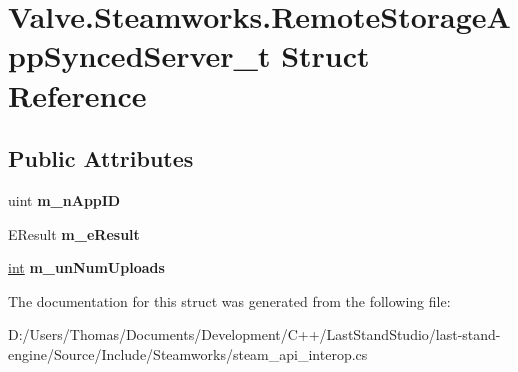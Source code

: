 \hypertarget{structValve_1_1Steamworks_1_1RemoteStorageAppSyncedServer__t}{}\section{Valve.\+Steamworks.\+Remote\+Storage\+App\+Synced\+Server\+\_\+t Struct Reference}
\label{structValve_1_1Steamworks_1_1RemoteStorageAppSyncedServer__t}
\subsection*{Public Attributes}
\begin{DoxyCompactItemize}
\item 
\hypertarget{structValve_1_1Steamworks_1_1RemoteStorageAppSyncedServer__t_a214b906501a62699f359b30528614b03}{}uint {\bfseries m\+\_\+n\+App\+I\+D}\label{structValve_1_1Steamworks_1_1RemoteStorageAppSyncedServer__t_a214b906501a62699f359b30528614b03}

\item 
\hypertarget{structValve_1_1Steamworks_1_1RemoteStorageAppSyncedServer__t_a1bcf46e9b3b96582aa9fbbf64b6270ea}{}E\+Result {\bfseries m\+\_\+e\+Result}\label{structValve_1_1Steamworks_1_1RemoteStorageAppSyncedServer__t_a1bcf46e9b3b96582aa9fbbf64b6270ea}

\item 
\hypertarget{structValve_1_1Steamworks_1_1RemoteStorageAppSyncedServer__t_aa7e0f80e4fdb1f9b534a2e2e16fc6e70}{}\hyperlink{SDL__thread_8h_a6a64f9be4433e4de6e2f2f548cf3c08e}{int} {\bfseries m\+\_\+un\+Num\+Uploads}\label{structValve_1_1Steamworks_1_1RemoteStorageAppSyncedServer__t_aa7e0f80e4fdb1f9b534a2e2e16fc6e70}

\end{DoxyCompactItemize}


The documentation for this struct was generated from the following file\+:\begin{DoxyCompactItemize}
\item 
D\+:/\+Users/\+Thomas/\+Documents/\+Development/\+C++/\+Last\+Stand\+Studio/last-\/stand-\/engine/\+Source/\+Include/\+Steamworks/steam\+\_\+api\+\_\+interop.\+cs\end{DoxyCompactItemize}
